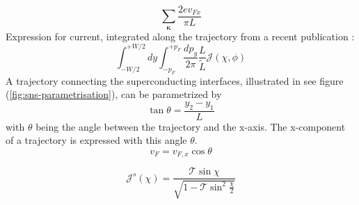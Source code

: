 \begin{equation}
\sum_\mathbf{\kappa} \frac{2 e v_{Fx}}{\pi L}
\end{equation}
Expression for current, integrated along the trajectory from a recent publication \cite{Meier2016}:
\begin{equation}
\int_{-W/2}^{+W/2} dy \int_{-p_F}^{+p_F} \frac{dp_y}{2 \pi} \frac{L}{\tilde{L}} \mathcal{J} \left( \chi, \phi \right)
\end{equation}
A trajectory connecting the superconducting interfaces, illustrated in see figure (\ref{fig:sns-parametrisation}), can be parametrized by 
\begin{equation}
\tan \theta = \frac{y_2 - y_1}{L}
\label{eq:parametrization}
\end{equation}
with $\theta$ being the angle between the trajectory and the x-axis.
The x-component of a trajectory is expressed with this angle $\theta$. 
\begin{equation}
v_F = v_{F,x} \cos \theta
\end{equation}

\begin{equation}
\mathcal{J}^s (\chi) = \frac{\mathcal{T} \sin \chi}{\sqrt{1 - \mathcal{T} \sin^2 \frac{\chi}{2}}}
\end{equation}


